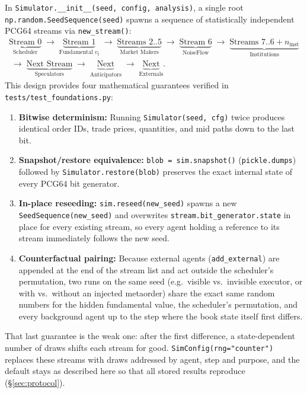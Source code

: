 \documentclass[11pt,a4paper]{article}
\newcommand{\code}[1]{\texttt{#1}}
\begin{document}
In \code{Simulator.\_\_init\_\_(seed, config, analysis)}, a single root
\code{np.random.SeedSequence(seed)} spawns a sequence of statistically independent PCG64 streams via
\code{new\_stream()}:
\begin{align*}
  \underbrace{\text{Stream 0}}_{\text{Scheduler}} \;\to\;
  \underbrace{\text{Stream 1}}_{\text{Fundamental } v_t} \;\to\;
  \underbrace{\text{Streams } 2..5}_{\text{Market Makers}} \;\to\;
  \underbrace{\text{Stream 6}}_{\text{NoiseFlow}} \;\to\;
  \underbrace{\text{Streams } 7..6+n_{\text{inst}}}_{\text{Institutions}} \\
  \;\to\;
  \underbrace{\text{Next Stream}}_{\text{Speculators}} \;\to\;
  \underbrace{\text{Next}}_{\text{Anticipators}} \;\to\;
  \underbrace{\text{Next}}_{\text{Externals}}.
\end{align*}
This design provides four mathematical guarantees verified in \code{tests/test\_foundations.py}:
\begin{enumerate}[nosep]
\item \textbf{Bitwise determinism:} Running \code{Simulator(seed, cfg)} twice produces identical order
  IDs, trade prices, quantities, and mid paths down to the last bit.
\item \textbf{Snapshot/restore equivalence:} \code{blob = sim.snapshot()} (\code{pickle.dumps}) followed
  by \code{Simulator.restore(blob)} preserves the exact internal state of every PCG64 bit generator.
\item \textbf{In-place reseeding:} \code{sim.reseed(new\_seed)} spawns a new \code{SeedSequence(new\_seed)}
  and overwrites \code{stream.bit\_generator.state} in place for every existing stream, so every agent
  holding a reference to its stream immediately follows the new seed.
\item \textbf{Counterfactual pairing:} Because external agents (\code{add\_external}) are appended at the
  end of the stream list and act outside the scheduler's permutation, two runs on the same seed (e.g.\
  visible vs.\ invisible executor, or with vs.\ without an injected metaorder) share the exact same
  random numbers for the hidden fundamental value, the scheduler's permutation, and every background
  agent up to the step where the book state itself first differs.
\end{enumerate}
That last guarantee is the weak one: after the first difference, a state-dependent number of draws shifts each stream for good. \code{SimConfig(rng="counter")} replaces these streams with draws addressed by agent, step and purpose, and the default stays as described here so that all stored results reproduce (\S\ref{sec:protocol}).
\end{document}
